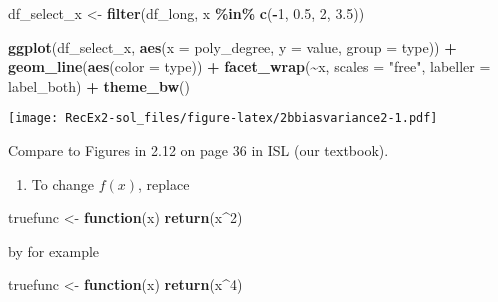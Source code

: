 \documentclass[
]{article}
\newenvironment{Shaded}{\begin{snugshade}}{\end{snugshade}}
\newcommand{\AttributeTok}[1]{\textcolor[rgb]{0.13,0.29,0.53}{#1}}
\newcommand{\ControlFlowTok}[1]{\textcolor[rgb]{0.13,0.29,0.53}{\textbf{#1}}}
\newcommand{\DecValTok}[1]{\textcolor[rgb]{0.00,0.00,0.81}{#1}}
\newcommand{\FloatTok}[1]{\textcolor[rgb]{0.00,0.00,0.81}{#1}}
\newcommand{\FunctionTok}[1]{\textcolor[rgb]{0.13,0.29,0.53}{\textbf{#1}}}
\newcommand{\NormalTok}[1]{#1}
\newcommand{\OtherTok}[1]{\textcolor[rgb]{0.56,0.35,0.01}{#1}}
\newcommand{\SpecialCharTok}[1]{\textcolor[rgb]{0.81,0.36,0.00}{\textbf{#1}}}
\newcommand{\StringTok}[1]{\textcolor[rgb]{0.31,0.60,0.02}{#1}}
\providecommand{\tightlist}{%
  \setlength{\itemsep}{0pt}\setlength{\parskip}{0pt}}
\begin{document}
\begin{Shaded}
\begin{Highlighting}[]
\NormalTok{df\_select\_x }\OtherTok{\textless{}{-}} \FunctionTok{filter}\NormalTok{(df\_long, x }\SpecialCharTok{\%in\%} \FunctionTok{c}\NormalTok{(}\SpecialCharTok{{-}}\DecValTok{1}\NormalTok{, }\FloatTok{0.5}\NormalTok{, }\DecValTok{2}\NormalTok{, }\FloatTok{3.5}\NormalTok{))}

\FunctionTok{ggplot}\NormalTok{(df\_select\_x, }\FunctionTok{aes}\NormalTok{(}\AttributeTok{x =}\NormalTok{ poly\_degree, }\AttributeTok{y =}\NormalTok{ value, }\AttributeTok{group =}\NormalTok{ type)) }\SpecialCharTok{+}
  \FunctionTok{geom\_line}\NormalTok{(}\FunctionTok{aes}\NormalTok{(}\AttributeTok{color =}\NormalTok{ type)) }\SpecialCharTok{+}
  \FunctionTok{facet\_wrap}\NormalTok{(}\SpecialCharTok{\textasciitilde{}}\NormalTok{x, }\AttributeTok{scales =} \StringTok{"free"}\NormalTok{, }\AttributeTok{labeller =}\NormalTok{ label\_both) }\SpecialCharTok{+}
  \FunctionTok{theme\_bw}\NormalTok{()}
\end{Highlighting}
\end{Shaded}

\texttt{[image: RecEx2-sol\_files/figure-latex/2bbiasvariance2-1.pdf]}

Compare to Figures in 2.12 on page 36 in ISL (our textbook).

\begin{enumerate}
\def\labelenumi{\alph{enumi})}
\setcounter{enumi}{3}
\tightlist
\item
  To change \(f(x)\), replace
\end{enumerate}

\begin{Shaded}
\begin{Highlighting}[]
\NormalTok{truefunc }\OtherTok{\textless{}{-}} \ControlFlowTok{function}\NormalTok{(x) }\FunctionTok{return}\NormalTok{(x}\SpecialCharTok{\^{}}\DecValTok{2}\NormalTok{)}
\end{Highlighting}
\end{Shaded}

by for example

\begin{Shaded}
\begin{Highlighting}[]
\NormalTok{truefunc }\OtherTok{\textless{}{-}} \ControlFlowTok{function}\NormalTok{(x) }\FunctionTok{return}\NormalTok{(x}\SpecialCharTok{\^{}}\DecValTok{4}\NormalTok{)}
\end{Highlighting}
\end{Shaded}
\end{document}
